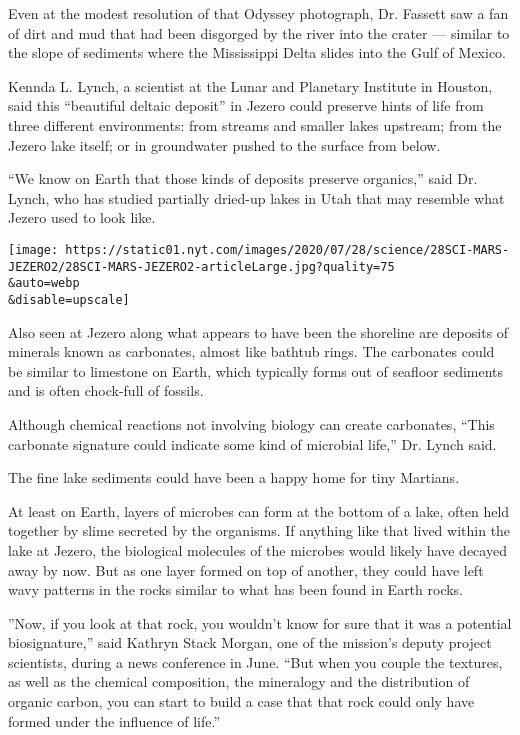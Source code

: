 Even at the modest resolution of that Odyssey photograph, Dr. Fassett
saw a fan of dirt and mud that had been disgorged by the river into the
crater --- similar to the slope of sediments where the Mississippi Delta
slides into the Gulf of Mexico.

Kennda L. Lynch, a scientist at the Lunar and Planetary Institute in
Houston, said this ``beautiful deltaic deposit'' in Jezero could
preserve hints of life from three different environments: from streams
and smaller lakes upstream; from the Jezero lake itself; or in
groundwater pushed to the surface from below.

``We know on Earth that those kinds of deposits preserve organics,''
said Dr. Lynch, who has studied partially dried-up lakes in Utah that
may resemble what Jezero used to look like.

\texttt{[image: https://static01.nyt.com/images/2020/07/28/science/28SCI-MARS-JEZERO2/28SCI-MARS-JEZERO2-articleLarge.jpg?quality=75\\\&auto=webp\\\&disable=upscale]}

Also seen at Jezero along what appears to have been the shoreline are
deposits of minerals known as carbonates, almost like bathtub rings. The
carbonates could be similar to limestone on Earth, which typically forms
out of seafloor sediments and is often chock-full of fossils.

Although chemical reactions not involving biology can create carbonates,
``This carbonate signature could indicate some kind of microbial life,''
Dr. Lynch said.

The fine lake sediments could have been a happy home for tiny Martians.

At least on Earth, layers of microbes can form at the bottom of a lake,
often held together by slime secreted by the organisms. If anything like
that lived within the lake at Jezero, the biological molecules of the
microbes would likely have decayed away by now. But as one layer formed
on top of another, they could have left wavy patterns in the rocks
similar to what has been found in Earth rocks.

''Now, if you look at that rock, you wouldn't know for sure that it was
a potential biosignature,'' said Kathryn Stack Morgan, one of the
mission's deputy project scientists, during a news conference in June.
``But when you couple the textures, as well as the chemical composition,
the mineralogy and the distribution of organic carbon, you can start to
build a case that that rock could only have formed under the influence
of life.''

